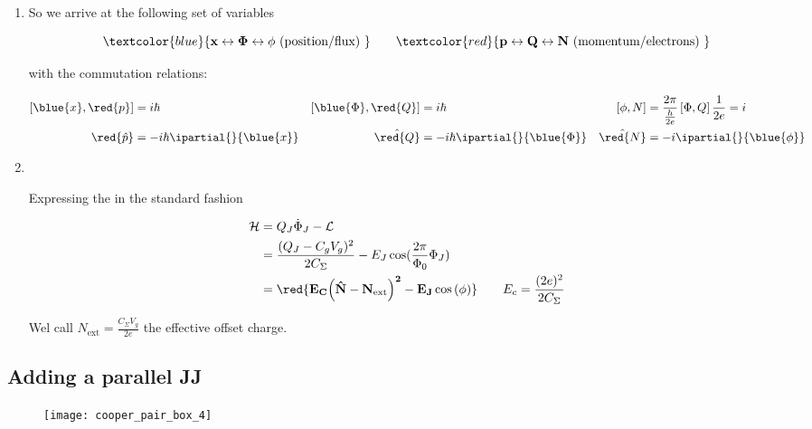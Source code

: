\begin{enumerate}
\item So we arrive at the following set of variables

  \begin{equation}
    { \textcolor{blue}{\mathbf{x\leftrightarrow \Phi \leftrightarrow \phi} \text{ (position/flux) }}\qquad \textcolor{red}{\mathbf{p\leftrightarrow Q \leftrightarrow N \text{ (momentum/electrons) }}}}
  \end{equation}

  \noindent with the commutation relations:

  \begin{align}
    \left[\blue{x},\red{p}\right] & =i\hbar & \left[\blue{\Phi},\red{Q}\right] & = i\hbar & \left[\phi,N\right] & = \frac{2\pi}{\frac{h}{2e}}\left[\Phi,Q\right]\frac{1}{2e} = i\\
    \red{\hat{p}} & = -i\hbar\ipartial{}{\blue{x}} & \hat{\red{Q}} & =-i\hbar\ipartial{}{\blue{\Phi}} & \hat{\red{N}} & =-i\ipartial{}{\blue{\phi}}
  \end{align}

\item\

\begin{framed}\noindent
  Expressing the  in the standard fashion

  \begin{equation}\label{eqn:cpbox_final}
    \begin{aligned}
      \mathcal{H} & = Q_J\dot{\Phi}_J - \mathcal{L}\\
      & = \frac{(Q_J - C_gV_g)^2}{2C_\Sigma} - E_J\cos(\frac{2\pi}{\Phi_0}\Phi_J)\\
      &     =      \mathbf{\red{E_C{\left(\hat{N}-N_\text{ext}\right)^2}-     E_J\cos\left(\phi\right)}}\qquad      E_c     =
      \frac{(2e)^2}{2C_\Sigma}
    \end{aligned}
  \end{equation}

  \noindent Wel call $ N_\text{ext} = \frac{C_\Sigma V_g}{2e} $ the effective offset charge.
\end{framed}
\end{enumerate}

\subsection{Adding a parallel JJ\label{subsec:cpb_2}}
\begin{figure}[h]
  \centering \texttt{[image: cooper\_pair\_box\_4]}
\end{figure}

